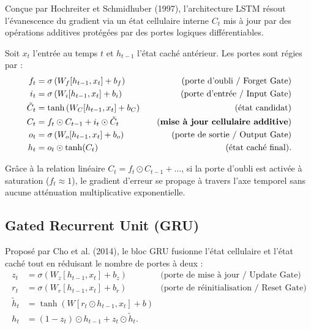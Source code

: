 Conçue par Hochreiter et Schmidhuber (1997), l'architecture LSTM résout l'évanescence du gradient via un état cellulaire interne $C_t$ mis à jour par des opérations additives protégées par des portes logiques différentiables.

\begin{definition}
    Soit $x_t$ l'entrée au temps $t$ et $h_{t-1}$ l'état caché antérieur. Les portes sont régies par :
    \begin{align}
        f_t &= \sigma\left(W_f [h_{t-1}, x_t] + b_f\right) \quad &\text{(porte d'oubli / Forget Gate)} \\
        i_t &= \sigma\left(W_i [h_{t-1}, x_t] + b_i\right) \quad &\text{(porte d'entrée / Input Gate)} \\
        \tilde{C}_t &= \tanh\left(W_C [h_{t-1}, x_t] + b_C\right) \quad &\text{(état candidat)} \\
        C_t &= f_t \odot C_{t-1} + i_t \odot \tilde{C}_t \quad &\text{(\textbf{mise à jour cellulaire additive})} \\
        o_t &= \sigma\left(W_o [h_{t-1}, x_t] + b_o\right) \quad &\text{(porte de sortie / Output Gate)} \\
        h_t &= o_t \odot \tanh(C_t) \quad &\text{(état caché final)}.
    \end{align}
\end{definition}

Grâce à la relation linéaire $C_t = f_t \odot C_{t-1} + \dots$, si la porte d'oubli est activée à saturation ($f_t \approx 1$), le gradient d'erreur se propage à travers l'axe temporel sans aucune atténuation multiplicative exponentielle.

\subsection{Gated Recurrent Unit (GRU)}

Proposé par Cho et al. (2014), le bloc GRU fusionne l'état cellulaire et l'état caché tout en réduisant le nombre de portes à deux :
\begin{align}
    z_t &= \sigma\left(W_z [h_{t-1}, x_t] + b_z\right) \quad &\text{(porte de mise à jour / Update Gate)} \\
    r_t &= \sigma\left(W_r [h_{t-1}, x_t] + b_r\right) \quad &\text{(porte de réinitialisation / Reset Gate)} \\
    \tilde{h}_t &= \tanh\left(W [r_t \odot h_{t-1}, x_t] + b\right) \\
    h_t &= (1 - z_t) \odot h_{t-1} + z_t \odot \tilde{h}_t.
\end{align}

